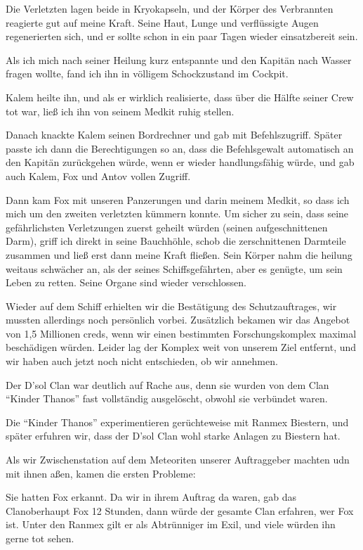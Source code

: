 \documentclass[11pt]{scrartcl}
\begin{document}
Die Verletzten lagen beide in Kryokapseln, und der Körper des
Verbrannten reagierte gut auf meine Kraft. Seine Haut, Lunge und
verflüssigte Augen regenerierten sich, und er sollte schon in ein paar
Tagen wieder einsatzbereit sein.

Als ich mich nach seiner Heilung kurz entspannte und den Kapitän nach
Wasser fragen wollte, fand ich ihn in völligem Schockzustand im Cockpit.

Kalem heilte ihn, und als er wirklich realisierte, dass über die Hälfte
seiner Crew tot war, ließ ich ihn von seinem Medkit ruhig stellen.

Danach knackte Kalem seinen Bordrechner und gab mit Befehlszugriff.
Später passte ich dann die Berechtigungen so an, dass die Befehlsgewalt
automatisch an den Kapitän zurückgehen würde, wenn er wieder
handlungsfähig würde, und gab auch Kalem, Fox und Antov vollen Zugriff.

Dann kam Fox mit unseren Panzerungen und darin meinem Medkit, so dass
ich mich um den zweiten verletzten kümmern konnte. Um sicher zu sein,
dass seine gefährlichsten Verletzungen zuerst geheilt würden (seinen
aufgeschnittenen Darm), griff ich direkt in seine Bauchhöhle, schob die
zerschnittenen Darmteile zusammen und ließ erst dann meine Kraft
fließen. Sein Körper nahm die heilung weitaus schwächer an, als der
seines Schiffsgefährten, aber es genügte, um sein Leben zu retten. Seine
Organe sind wieder verschlossen.

Wieder auf dem Schiff erhielten wir die Bestätigung des Schutzauftrages,
wir mussten allerdings noch persönlich vorbei. Zusätzlich bekamen wir
das Angebot von 1,5 Millionen creds, wenn wir einen bestimmten
Forschungskomplex maximal beschädigen würden. Leider lag der Komplex
weit von unserem Ziel entfernt, und wir haben auch jetzt noch nicht
entschieden, ob wir annehmen.

Der D'sol Clan war deutlich auf Rache aus, denn sie wurden von dem Clan
``Kinder Thanos'' fast vollständig ausgelöscht, obwohl sie verbündet
waren.

Die ``Kinder Thanos'' experimentieren gerüchteweise mit Ranmex Biestern,
und später erfuhren wir, dass der D'sol Clan wohl starke Anlagen zu
Biestern hat.

Als wir Zwischenstation auf dem Meteoriten unserer Auftraggeber machten
udn mit ihnen aßen, kamen die ersten Probleme:

Sie hatten Fox erkannt. Da wir in ihrem Auftrag da waren, gab das
Clanoberhaupt Fox 12 Stunden, dann würde der gesamte Clan erfahren, wer
Fox ist. Unter den Ranmex gilt er als Abtrünniger im Exil, und viele
würden ihn gerne tot sehen.
\end{document}
